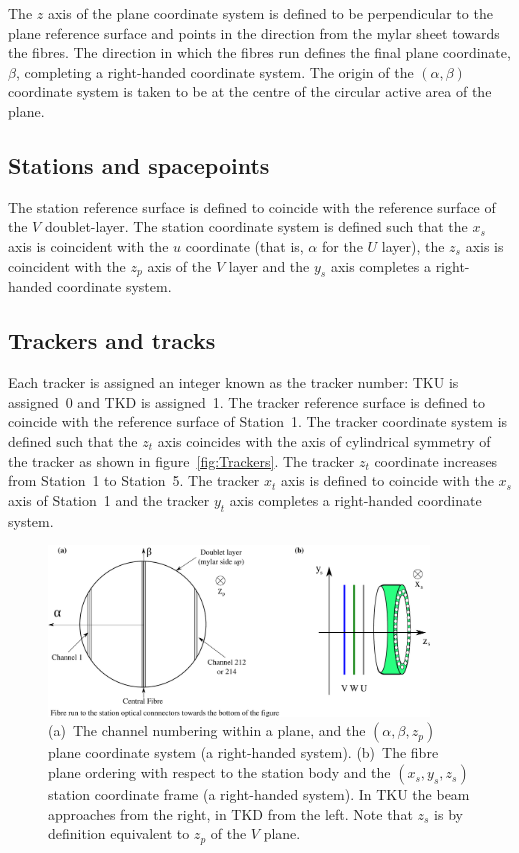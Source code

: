   The $z$ axis of the plane coordinate system is defined to be perpendicular to the plane reference surface and points in the direction from the mylar sheet towards the fibres. The direction in which the fibres run defines the final plane coordinate, $\beta$, completing a right-handed coordinate system. The origin of the $(\alpha, \beta)$ coordinate system is taken to be at the centre of the circular active area of the plane.

  \subsection{Stations and spacepoints}
  The station reference surface is defined to coincide with the reference surface of the $V$ doublet-layer. The station coordinate system is defined such that the $x_s$ axis is coincident with the $u$ coordinate (that is, $\alpha$ for the $U$ layer), the $z_s$ axis is coincident with the $z_p$ axis of the $V$ layer and the $y_s$ axis completes a right-handed coordinate system.

  \subsection{Trackers and tracks}
  Each tracker is assigned an integer known as the tracker number: TKU is assigned~0 and TKD is assigned~1. The tracker reference surface is defined to coincide with the reference surface of Station~1. The tracker coordinate system is defined such that the $z_t$ axis coincides with the axis of cylindrical symmetry of the tracker as shown in figure~\ref{fig:Trackers}. The tracker $z_t$ coordinate increases from Station~1 to Station~5. The tracker $x_t$ axis is defined to coincide with the $x_s$ axis of Station~1 and the tracker $y_t$ axis completes a right-handed coordinate system. 
  
  \begin{figure}[htb]
    \begin{center}
      \includegraphics[width=0.9\textwidth]{02-CoordinateSystems/PlaneCoordinatesAndNumbering.pdf}
      \caption{\label{fig:DoubletLayerOrder} (a)~The channel numbering within a plane, and the $(\alpha, \beta, z_p)$ plane coordinate system (a right-handed system).  (b)~The fibre plane ordering with respect to the station body and the $(x_s, y_s, z_s)$ station coordinate frame (a right-handed system).  In TKU the beam approaches from the right, in TKD from the left. Note that $z_s$ is by definition equivalent to $z_p$ of the $V$ plane.}
    \end{center}
  \end{figure}


